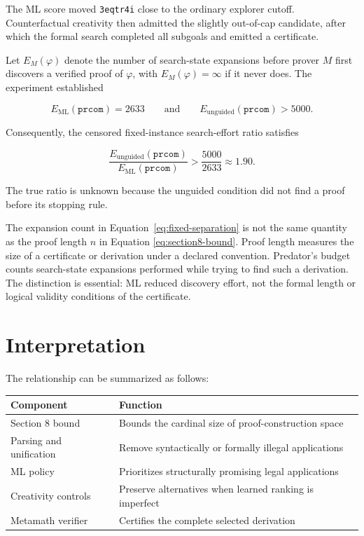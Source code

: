 \documentclass[11pt]{article}
\newcommand{\prcom}{\texttt{prcom}}
\begin{document}
The ML score moved \texttt{3eqtr4i} close to the ordinary explorer
cutoff.  Counterfactual creativity then admitted the slightly
out-of-cap candidate, after which the formal search completed all
subgoals and emitted a certificate.

Let $E_M(\varphi)$ denote the number of search-state expansions before
prover $M$ first discovers a verified proof of $\varphi$, with
$E_M(\varphi)=\infty$ if it never does.  The experiment established

\[
E_{\mathrm{ML}}(\prcom)=2633
\qquad\text{and}\qquad
E_{\mathrm{unguided}}(\prcom)>5000.
\]

Consequently, the censored fixed-instance search-effort ratio satisfies

\begin{equation}
\frac{E_{\mathrm{unguided}}(\prcom)}
     {E_{\mathrm{ML}}(\prcom)}
>
\frac{5000}{2633}
\approx 1.90.
\label{eq:fixed-separation}
\end{equation}

The true ratio is unknown because the unguided condition did not find
a proof before its stopping rule.

The expansion count in Equation~\eqref{eq:fixed-separation} is not the
same quantity as the proof length $n$ in Equation
\eqref{eq:section8-bound}.  Proof length measures the size of a
certificate or derivation under a declared convention.  Predator's
budget counts search-state expansions performed while trying to find
such a derivation.  The distinction is essential: ML reduced discovery
effort, not the formal length or logical validity conditions of the
certificate.

\section{Interpretation}

The relationship can be summarized as follows:

\begin{center}
\begin{tabular}{@{}p{}p{}@{}}
\toprule
Component & Function \\
\midrule
Section 8 bound & Bounds the cardinal size of proof-construction space \\
Parsing and unification & Remove syntactically or formally illegal applications \\
ML policy & Prioritizes structurally promising legal applications \\
Creativity controls & Preserve alternatives when learned ranking is imperfect \\
Metamath verifier & Certifies the complete selected derivation \\
\bottomrule
\end{tabular}
\end{center}
\end{document}
